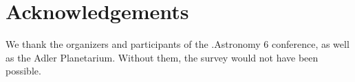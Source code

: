 \section{Acknowledgements}

We thank the organizers and participants of the .Astronomy 6 conference, as well as the Adler Planetarium.  Without them, the survey would not have been possible.
